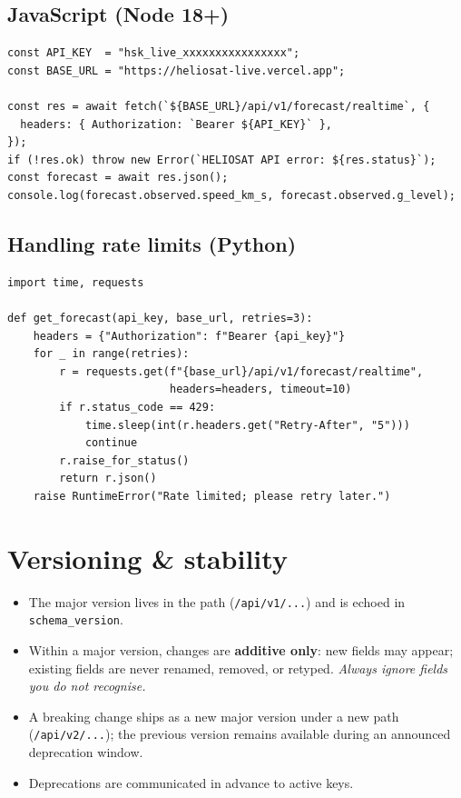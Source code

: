 \documentclass[11pt,a4paper]{article}
\newcommand{\tc}[1]{\texttt{#1}}
\begin{document}
\subsection{JavaScript (Node 18+)}
\begin{lstlisting}[style=js]
const API_KEY  = "hsk_live_xxxxxxxxxxxxxxxx";
const BASE_URL = "https://heliosat-live.vercel.app";

const res = await fetch(`${BASE_URL}/api/v1/forecast/realtime`, {
  headers: { Authorization: `Bearer ${API_KEY}` },
});
if (!res.ok) throw new Error(`HELIOSAT API error: ${res.status}`);
const forecast = await res.json();
console.log(forecast.observed.speed_km_s, forecast.observed.g_level);
\end{lstlisting}

\subsection{Handling rate limits (Python)}
\begin{lstlisting}[style=python]
import time, requests

def get_forecast(api_key, base_url, retries=3):
    headers = {"Authorization": f"Bearer {api_key}"}
    for _ in range(retries):
        r = requests.get(f"{base_url}/api/v1/forecast/realtime",
                         headers=headers, timeout=10)
        if r.status_code == 429:
            time.sleep(int(r.headers.get("Retry-After", "5")))
            continue
        r.raise_for_status()
        return r.json()
    raise RuntimeError("Rate limited; please retry later.")
\end{lstlisting}

\section{Versioning \& stability}

\begin{itemize}[leftmargin=1.4em]
  \item The major version lives in the path (\tc{/api/v1/...}) and is echoed in
        \tc{schema\_version}.
  \item Within a major version, changes are \textbf{additive only}: new fields may
        appear; existing fields are never renamed, removed, or retyped. \emph{Always
        ignore fields you do not recognise.}
  \item A breaking change ships as a new major version under a new path
        (\tc{/api/v2/...}); the previous version remains available during an announced
        deprecation window.
  \item Deprecations are communicated in advance to active keys.
\end{itemize}
\end{document}
